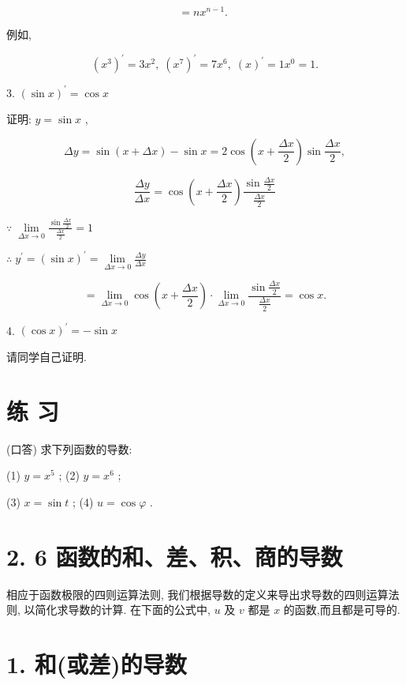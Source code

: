 \documentclass[10pt]{article}
\begin{document}
\[
= n{x}^{n - 1}\text{. }
\]

例如,

\[
{\left( {x}^{3}\right) }^{\prime } = 3{x}^{2},\;{\left( {x}^{7}\right) }^{\prime } = 7{x}^{6},\;{\left( x\right) }^{\prime } = 1{x}^{0} = 1.
\]

3. \({\left( \sin x\right) }^{\prime } = \cos x\)

证明: \(y = \sin x\) ,

\[
{\Delta y} = \sin \left( {x + {\Delta x}}\right) - \sin x = 2\cos \left( {x + \frac{\Delta x}{2}}\right) \sin \frac{\Delta x}{2},
\]

\[
\frac{\Delta y}{\Delta x} = \cos \left( {x + \frac{\Delta x}{2}}\right) \frac{\sin \frac{\Delta x}{2}}{\frac{\Delta x}{2}}
\]

\(\because \;\mathop{\lim }\limits_{{{\Delta x} \rightarrow 0}}\frac{\sin \frac{\Delta x}{2}}{\frac{\Delta x}{2}} = 1\)

\(\therefore \;{y}^{\prime } = {\left( \sin x\right) }^{\prime } = \mathop{\lim }\limits_{{{\Delta x} \rightarrow 0}}\frac{\Delta y}{\Delta x}\)

\[
= \mathop{\lim }\limits_{{{\Delta x} \rightarrow 0}}\cos \left( {x + \frac{\Delta x}{2}}\right) \cdot \mathop{\lim }\limits_{{{\Delta x} \rightarrow 0}}\frac{\sin \frac{\Delta x}{2}}{\frac{\Delta x}{2}} = \cos x.
\]

4. \({\left( \cos x\right) }^{\prime } = - \sin x\)

请同学自己证明.

\section*{练 习}

(口答) 求下列函数的导数:

(1) \(y = {x}^{5}\) ; (2) \(y = {x}^{6}\) ;

(3) \(x = \sin t\) ; (4) \(u = \cos \varphi\) .

\section*{2. 6 函数的和、差、积、商的导数}

相应于函数极限的四则运算法则, 我们根据导数的定义来导出求导数的四则运算法则, 以简化求导数的计算. 在下面的公式中, \(u\) 及 \(v\) 都是 \(x\) 的函数,而且都是可导的.

\section*{1. 和(或差)的导数}
\end{document}
